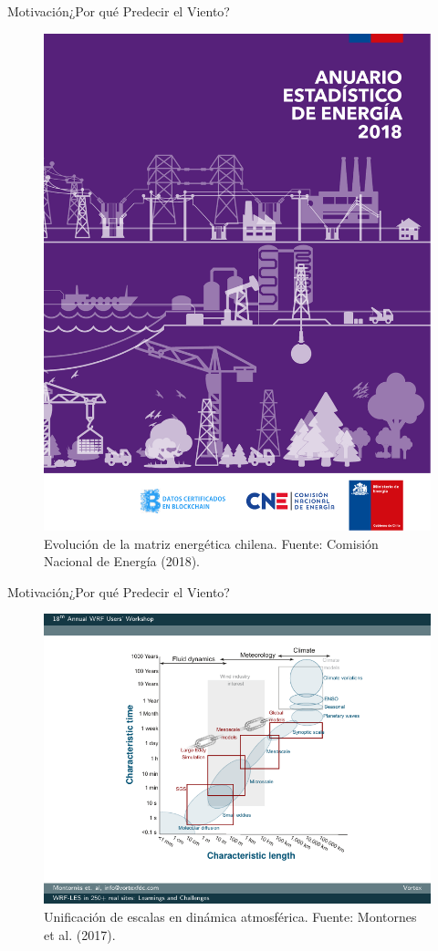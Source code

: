 \documentclass[mathserif]{beamer}
\begin{document}
\begin{frame}{Motivación}{¿Por qué Predecir el Viento?}
\begin{figure}
	\includegraphics[width=1.0\linewidth,page=30,trim={2cm 2.5cm 2.5cm 23.1cm},clip]{fig/01/Anuario-CNE-2018}
	\vspace{3mm}
	\caption{Evolución de la matriz energética chilena. Fuente: Comisión Nacional de Energía (2018).}
\end{figure}
\end{frame}

\begin{frame}{Motivación}{¿Por qué Predecir el Viento?}
	\begin{figure}
		\centering
		\includegraphics[width=0.7\linewidth,trim={2.6cm 1.4cm 1.5cm 0.8cm},clip]{fig/02/escalas}
		\vspace{-2mm}
		\caption{Unificación de escalas en dinámica atmosférica. Fuente: Montornes et al. (2017).}
	\end{figure}
\end{frame}
\end{document}
